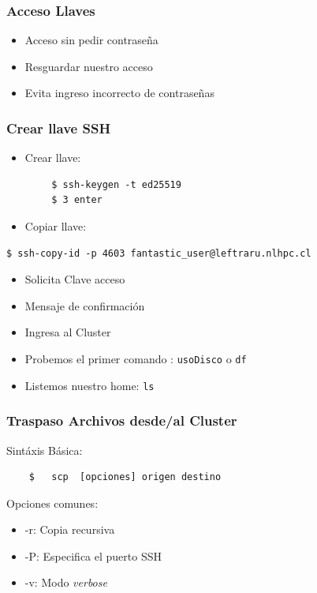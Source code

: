 \documentclass[aspectratio=169,professionalfonts]{beamer}
\begin{document}
\begin{frame}[fragile]
\frametitle{\textbf{Acceso Llaves}}
\begin{itemize}
    \item Acceso sin pedir contraseña
            \vspace{0.5em} 

    \item Resguardar nuestro acceso 
            \vspace{0.5em} 

    \item Evita ingreso incorrecto de contraseñas
    
\end{itemize}
    
\end{frame}

\begin{frame} [fragile]
\frametitle{\textbf{Crear llave SSH}}
\begin{itemize}
    \item Crear llave:
    \end{itemize}
    \begin{verbatim}
        $ ssh-keygen -t ed25519
        $ 3 enter
    \end{verbatim}
    
    \begin{itemize}
        \item Copiar llave:
    \end{itemize}

\begin{verbatim}
$ ssh-copy-id -p 4603 fantastic_user@leftraru.nlhpc.cl
    \end{verbatim}
\begin{itemize}
    \item Solicita Clave acceso
    \item Mensaje de confirmación
\item Ingresa al Cluster 
\item Probemos el primer comando : \texttt{usoDisco} o \texttt{df}
\item Listemos nuestro home: \texttt{ls}

    \end{itemize}
\end{frame}

\begin{frame}[fragile]
\frametitle{\textbf{Traspaso Archivos desde/al Cluster}}
Sintáxis Básica: \\
\begin{verbatim}
    $   scp  [opciones] origen destino
\end{verbatim}
\vspace{0.5em}
Opciones comunes:
    \begin{itemize}
        \item -r: Copia recursiva
        \vspace{0.5em}
        \item -P: Especifica el puerto SSH
        \vspace{0.5em}
        \item -v: Modo \textit{verbose}
    \end{itemize}
\end{frame}
\end{document}
